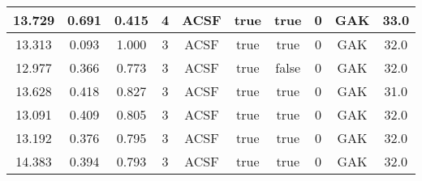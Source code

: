 \documentclass[12pt]{article}
\begin{document}
\begin{table}[H]
\begin{tabular}{|c|c|c|c|c|c|c|c|c|c|}
		13.729	& 0.691	& 0.415	& 4	& ACSF	& true	& true	& 0	& GAK	& 33.0	\\ \hline
		13.313	& 0.093	& 1.000	& 3	& ACSF	& true	& true	& 0	& GAK	& 32.0	\\ \hline
		12.977	& 0.366	& 0.773	& 3	& ACSF	& true	& false	& 0	& GAK	& 32.0	\\ \hline
		13.628	& 0.418	& 0.827	& 3	& ACSF	& true	& true	& 0	& GAK	& 31.0	\\ \hline
		13.091	& 0.409	& 0.805	& 3	& ACSF	& true	& true	& 0	& GAK	& 32.0	\\ \hline
		13.192	& 0.376	& 0.795	& 3	& ACSF	& true	& true	& 0	& GAK	& 32.0	\\ \hline
		14.383	& 0.394	& 0.793	& 3	& ACSF	& true	& true	& 0	& GAK	& 32.0	\\ \hline
	\end{tabular}
	\label{tab:hyperopt2}
\end{table}
\end{document}
